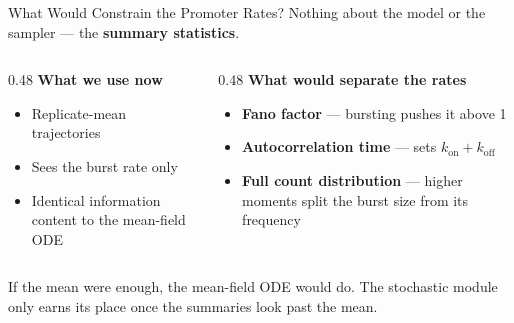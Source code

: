\documentclass[aspectratio=169]{beamer}
\begin{document}
\begin{frame}[noframenumbering]{What Would Constrain the Promoter Rates?}
	\small
	Nothing about the model or the sampler --- the \textbf{summary statistics}.

	\medskip
	\begin{columns}[T,onlytextwidth]
		\begin{column}{0.48\textwidth}
			\textbf{What we use now}
			\begin{itemize}\itemsep2pt
				\item Replicate-mean trajectories
				\item Sees the burst rate only
				\item Identical information content to the mean-field ODE
			\end{itemize}
		\end{column}
		\begin{column}{0.48\textwidth}
			\textbf{What would separate the rates}
			\begin{itemize}\itemsep2pt
				\item \textbf{Fano factor} --- bursting pushes it above 1
				\item \textbf{Autocorrelation time} --- sets
				$k_{\mathrm{on}}{+}k_{\mathrm{off}}$
				\item \textbf{Full count distribution} --- higher moments split
				the burst size from its frequency
			\end{itemize}
		\end{column}
	\end{columns}

	\vfill
	\centering
	\alert{\small If the mean were enough, the mean-field ODE would do. The
	stochastic module only earns its place once the summaries look past the
	mean.}
	\vspace{2mm}
\end{frame}
\end{document}
